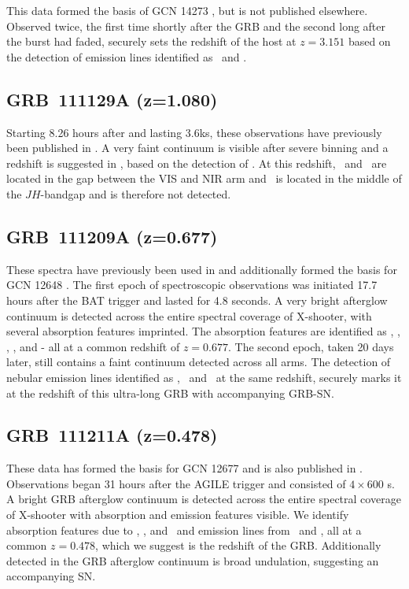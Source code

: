 \documentclass{aa}    %
\begin{document}
This data formed the basis of GCN 14273 \citep{GCN14273}, but is not published
elsewhere. Observed twice, the first time shortly after the GRB and the second
long after the burst had faded, securely sets the redshift of the host at $z =
3.151$ based on the detection of emission lines identified as \oii~and \oiii.

\subsection{GRB~111129A (z=1.080)} \label{111129}

Starting 8.26 hours after and lasting 3.6ks, these observations have previously
been published in \citet{Kruhler2015}. A very faint continuum is visible after
severe binning and a redshift is suggested in \citet{Kruhler2015}, based on the
detection of \oii. At this redshift, \hb~and \oii~are located in the gap between
the VIS and NIR arm and \ha~is located in the middle of the $JH$-bandgap and is
therefore not detected.

\subsection{GRB~111209A (z=0.677)} \label{111209}

These spectra have previously been used in \citet{Levan2013, Greiner2015,
	Kruhler2015, Kann2017} and additionally formed the basis for GCN 12648
\citep{GCN12648}. The first epoch of spectroscopic observations was initiated
17.7 hours after the BAT trigger and lasted for 4.8 seconds. A very bright
afterglow continuum is detected across the entire spectral coverage of
X-shooter, with several absorption features imprinted. The absorption features
are identified as \feii, \mgii, \mgi, \cah, and \cak - all at a common redshift
of $z = 0.677$. The second epoch, taken 20 days later, still contains a faint
continuum detected across all arms. The detection of nebular emission lines
identified as \oii, \oii~and \ha~at the same redshift, securely marks it at the
redshift of this ultra-long GRB with accompanying GRB-SN.

\subsection{GRB~111211A (z=0.478)} \label{111211}

These data has formed the basis for GCN 12677 \citep{GCN12677} and is also
published in \cite{Kruhler2015}. Observations began 31 hours after the AGILE
trigger and consisted of $4 \times 600$ s. A bright GRB afterglow continuum is
detected across the entire spectral coverage of X-shooter with absorption and
emission features visible. We identify absorption features due to \feii, \mgii,
and \caii~and emission lines from \oiii~and \ha, all at a common $z = 0.478$,
which we suggest is the redshift of the GRB. Additionally detected in the GRB
afterglow continuum is broad undulation, suggesting an accompanying SN.
\end{document}

